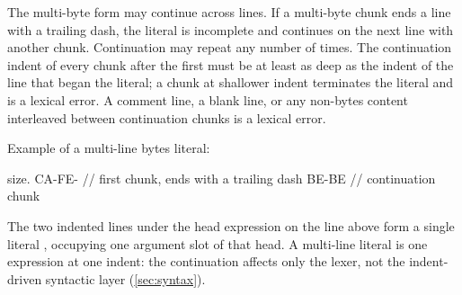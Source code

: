 The multi-byte form may continue across lines.
If a multi-byte chunk ends a line with a trailing dash, the literal is incomplete
  and continues on the next line with another  chunk.
Continuation may repeat any number of times.
The continuation indent of every chunk after the first must be at least as deep
  as the indent of the line that began the literal;
  a chunk at shallower indent terminates the literal and is a lexical error.
A comment line, a blank line, or any non-bytes content interleaved between
  continuation chunks is a lexical error.

Example of a multi-line bytes literal:
\begin{ffcode}
size.
  CA-FE-      // first chunk, ends with a trailing dash
  BE-BE       // continuation chunk
\end{ffcode}

The two indented lines under the head expression on the line above
  form a single  literal , occupying one
  argument slot of that head.
A multi-line literal is one expression at one indent: the continuation
  affects only the lexer, not the indent-driven syntactic layer
  (\cref{sec:syntax}).
